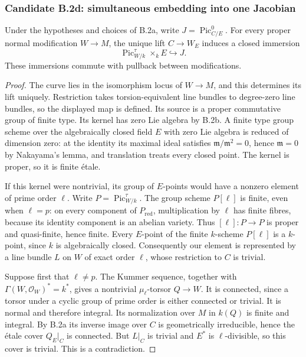 
\subsubsection*{Candidate B.2d: simultaneous embedding into one Jacobian}
Under the hypotheses and choices of B.2a, write $J=\operatorname{Pic}^0_{C/E}$.
For every proper normal modification $W\to M$, the unique lift
$C\to W_E$ induces a closed immersion
\[
 \operatorname{Pic}^{\tau}_{W/k}\times_kE\hookrightarrow J.
 \tag{B.2.3}
\]
These immersions commute with pullback between modifications.
\begin{proof}
The curve lies in the isomorphism locus of $W\to M$, and this determines
its lift uniquely.  Restriction takes torsion-equivalent line bundles to
degree-zero line bundles, so the displayed map is defined.  Its source
is a proper commutative group of finite type.  Its kernel has zero Lie
algebra by B.2b.  A finite type group scheme over the algebraically closed
field $E$ with zero Lie algebra is reduced of dimension zero: at the
identity its maximal ideal satisfies $\mathfrak m/\mathfrak m^2=0$,
hence $\mathfrak m=0$ by Nakayama's lemma, and translation treats every
closed point.  The kernel is proper, so it is finite \'etale.

If this kernel were nontrivial, its group of $E$-points would have a
nonzero element of prime order $\ell$.  Write
$P=\operatorname{Pic}^{\tau}_{W/k}$.  The group scheme $P[\ell]$ is
finite, even when $\ell=p$: on every component of $P_{\mathrm{red}}$,
multiplication by $\ell$ has finite fibres, because its identity component
is an abelian variety.  Thus $[\ell]:P\to P$ is proper and quasi-finite,
hence finite.  Every $E$-point of the finite $k$-scheme $P[\ell]$ is a
$k$-point, since $k$ is algebraically closed.  Consequently our element
is represented by a line bundle $L$ on $W$ of exact order $\ell$, whose
restriction to $C$ is trivial.

Suppose first that $\ell\ne p$.  The Kummer sequence, together with
$\Gamma(W,\mathcal O_W)^*=k^*$, gives a nontrivial
$\mu_\ell$-torsor $Q\to W$.  It is connected, since a torsor under
a cyclic group of prime order is either connected or trivial.  It is
normal and therefore integral.  Its normalization over $M$ in $k(Q)$
is finite and integral.  By B.2a its inverse image over $C$ is
geometrically irreducible, hence the \'etale cover $Q_E|_C$ is connected.
But $L|_C$ is trivial and $E^*$ is $\ell$-divisible, so this cover is
trivial.  This is a contradiction.


\end{proof}
